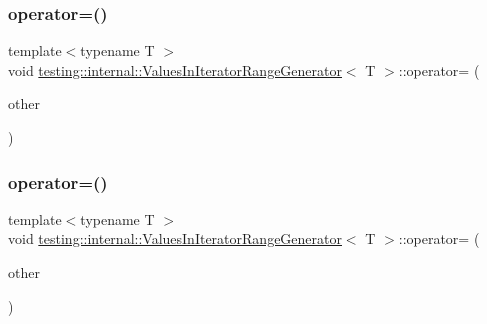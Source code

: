 \mbox{\label{classtesting_1_1internal_1_1_values_in_iterator_range_generator_ab43e1feff118f5be232ae1b85d539dd1}} 
\subsubsection{\texorpdfstring{operator=()}{operator=()}\hspace{0.1cm}{\footnotesize\ttfamily [2/3]}}
{\footnotesize\ttfamily template$<$typename T $>$ \\
void \mbox{\hyperlink{classtesting_1_1internal_1_1_values_in_iterator_range_generator}{testing\+::internal\+::\+Values\+In\+Iterator\+Range\+Generator}}$<$ T $>$\+::operator= (\begin{DoxyParamCaption}\item[{const \mbox{\hyperlink{classtesting_1_1internal_1_1_values_in_iterator_range_generator}{Values\+In\+Iterator\+Range\+Generator}}$<$ T $>$ \&}]{other }\end{DoxyParamCaption})\hspace{0.3cm}{\ttfamily [private]}}

\mbox{\label{classtesting_1_1internal_1_1_values_in_iterator_range_generator_ab43e1feff118f5be232ae1b85d539dd1}} 
\subsubsection{\texorpdfstring{operator=()}{operator=()}\hspace{0.1cm}{\footnotesize\ttfamily [3/3]}}
{\footnotesize\ttfamily template$<$typename T $>$ \\
void \mbox{\hyperlink{classtesting_1_1internal_1_1_values_in_iterator_range_generator}{testing\+::internal\+::\+Values\+In\+Iterator\+Range\+Generator}}$<$ T $>$\+::operator= (\begin{DoxyParamCaption}\item[{const \mbox{\hyperlink{classtesting_1_1internal_1_1_values_in_iterator_range_generator}{Values\+In\+Iterator\+Range\+Generator}}$<$ T $>$ \&}]{other }\end{DoxyParamCaption})\hspace{0.3cm}{\ttfamily [private]}}



